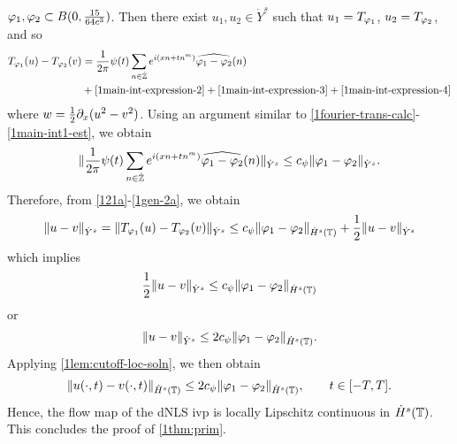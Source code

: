 $\varphi_1, \varphi_2 \subset B(0, \frac{15}{64c^{3}})$.  Then there exist $u_1, u_2 \in
\dot{Y}^s$ such that $u_1 = T_{\varphi_1}$, $u_2 = T_{\varphi_2}$, and so
%
%
\begin{equation}
	\label{1gen-1a}
	\begin{split}
		T_{\varphi_1}(u) - T_{\varphi_2}(v)
		& = \frac{1}{2\pi} \psi(t) \sum_{n \in
		\dot{\mathbb{Z}}}e^{i\left( xn + tn^m \right)} \widehat{\varphi_1 - \varphi_2}(n)
		\\
		& + \eqref{1main-int-expression-2} + \eqref{1main-int-expression-3} +
		\eqref{1main-int-expression-4} 
	\end{split}
\end{equation}
%
%
where $w = \frac{1}{2} \partial_x (u^2 - v^2)$. Using an argument similar to \eqref{1fourier-trans-calc}-\eqref{1main-int1-est},
we obtain
%
%
\begin{equation}
	\label{1gen-2a}
	\begin{split}
		\| \frac{1}{2\pi} \psi(t) \sum_{n \in
		\dot{\mathbb{Z}}}e^{i\left( xn + tn^m \right)} \widehat{\varphi_1 - \varphi_2}(n)\|_{\dot{Y}^s}
		\le c_\psi \|\varphi_{1} - \varphi_{2}\|_{\dot{Y}^s}.
	\end{split}
\end{equation}
%
%
Therefore, from \eqref{121a}-\eqref{1gen-2a}, we obtain
%
%
\begin{equation*}
	\begin{split}
		\|u -v \|_{\dot{Y}^s} = \|T_{\varphi_1}(u) - T_{\varphi_2}(v) \|_{\dot{Y}^s} \le c_\psi
		\|\varphi_{1} - \varphi_{2} \|_{\dot{H}^s\left( \mathbb{T} \right)} +
		\frac{1}{2} \|u -v \|_{\dot{Y}^s}
	\end{split}
\end{equation*}
%
%
which implies
%
%
\begin{equation*}
	\begin{split}
		\frac{1}{2} \|u-v\|_{\dot{Y}^s} \le c_\psi \|\varphi_1 - \varphi_2 \|_{\dot{H}^s(\mathbb{T})}
	\end{split}
\end{equation*}
%
%
or
%
%
\begin{equation*}
	\begin{split}
		\|u -v \|_{\dot{Y}^s} \le 2 c_\psi \|\varphi_1 - \varphi_2 \|_{\dot{H}^s(\mathbb{T})}.
	\end{split}
\end{equation*}
%
%
Applying \cref{1lem:cutoff-loc-soln}, we then obtain
%
%
	 \begin{equation*}
		 \begin{split}
			\|u(\cdot, t) -v(\cdot, t) \|_{\dot{H}^s(\mathbb{T})} \le 2 c_\psi \|\varphi_1 -
			\varphi_2 \|_{\dot{H}^s(\mathbb{T})}, \qquad t \in [-T, T].
		 \end{split}
	 \end{equation*}
Hence, the flow map of the dNLS ivp is locally Lipschitz continuous in
$\dot{H}^s(\mathbb{T})$. This
concludes the proof of \cref{1thm:prim}. \qquad \qedsymbol
%
%
%
%
